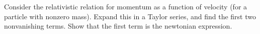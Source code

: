 Consider the relativistic relation for momentum as a function of velocity
(for a particle with nonzero mass).
Expand this in a Taylor series, and find the
first two nonvanishing terms. Show that the first term is the newtonian
expression.
